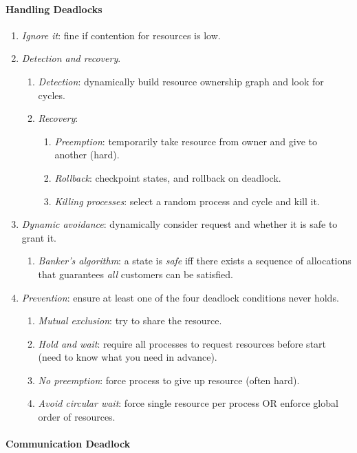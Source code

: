\documentclass[twocolumn,english]{article}
\begin{document}
\paragraph{Handling Deadlocks}
\begin{enumerate}
\item \emph{Ignore it}: fine if contention for resources is low.
\item \emph{Detection and recovery}.
\begin{enumerate}
\item \emph{Detection}: dynamically build resource ownership graph and look
for cycles.
\item \emph{Recovery}:
\begin{enumerate}
\item \emph{Preemption}: temporarily take resource from owner and give to
another (hard).
\item \emph{Rollback}: checkpoint states, and rollback on deadlock.
\item \emph{Killing processes}: select a random process and cycle and kill
it.
\end{enumerate}
\end{enumerate}
\item \emph{Dynamic avoidance}: dynamically consider request and whether
it is safe to grant it.
\begin{enumerate}
\item \emph{Banker's algorithm}: a state is \emph{safe} iff there exists
a sequence of allocations that guarantees \emph{all} customers can
be satisfied.
\end{enumerate}
\item \emph{Prevention}: ensure at least one of the four deadlock conditions
never holds.
\begin{enumerate}
\item \emph{Mutual exclusion}: try to share the resource.
\item \emph{Hold and wait}: require all processes to request resources before
start (need to know what you need in advance).
\item \emph{No preemption}: force process to give up resource (often hard).
\item \emph{Avoid circular wait}: force single resource per process OR enforce
global order of resources.
\end{enumerate}
\end{enumerate}

\paragraph{Communication Deadlock}
\end{document}

